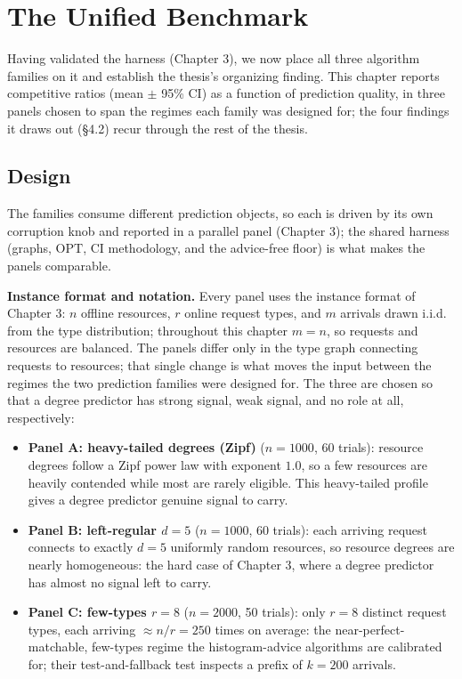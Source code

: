 \chapter{The Unified Benchmark}

Having validated the harness (Chapter 3), we now place all three
algorithm families on it and establish the thesis's organizing finding.
This chapter reports competitive ratios (mean \(\pm\) 95\% CI) as a
function of prediction quality, in three panels chosen to span the
regimes each family was designed for; the four findings it draws out
(§4.2) recur through the rest of the thesis.

\section{Design}

The families consume different prediction objects, so each is driven by
its own corruption knob and reported in a parallel panel (Chapter 3);
the shared harness (graphs, \(\mathrm{OPT}\), CI methodology, and the
advice-free floor) is what makes the panels comparable.

\textbf{Instance format and notation.} Every panel uses the instance
format of Chapter 3: \(n\) offline resources, \(r\) online request
types, and \(m\) arrivals drawn i.i.d. from the type distribution;
throughout this chapter \(m=n\), so requests and resources are balanced.
The panels differ only in the type graph connecting requests to
resources; that single change is what moves the input between the
regimes the two prediction families were designed for. The three are
chosen so that a degree predictor has strong signal, weak signal, and no
role at all, respectively:

\begin{itemize}
\tightlist
\item
  \textbf{Panel A: heavy-tailed degrees (Zipf)} (\(n=1000\), 60 trials):
  resource degrees follow a Zipf power law with exponent \(1.0\), so a
  few resources are heavily contended while most are rarely eligible.
  This heavy-tailed profile gives a degree predictor genuine signal to
  carry.
\item
  \textbf{Panel B: left-regular \(d{=}5\)} (\(n=1000\), 60 trials): each
  arriving request connects to exactly \(d=5\) uniformly random
  resources, so resource degrees are nearly homogeneous: the hard case
  of Chapter 3, where a degree predictor has almost no signal left to
  carry.
\item
  \textbf{Panel C: few-types \(r{=}8\)} (\(n=2000\), 50 trials): only
  \(r=8\) distinct request types, each arriving \(\approx n/r=250\)
  times on average: the near-perfect-matchable, few-types regime the
  histogram-advice algorithms are calibrated for; their
  test-and-fallback test inspects a prefix of \(k=200\) arrivals.
\end{itemize}


